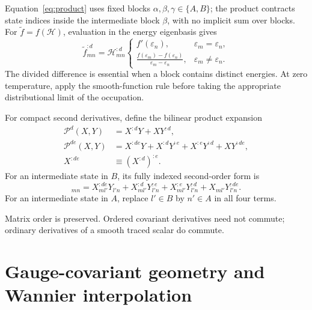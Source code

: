 \documentclass[prx,amsmath,amssymb,superscriptaddress,longbibliography]{revtex4-2}
\begin{document}
Equation~\eqref{eq:product} uses fixed blocks
$\alpha,\beta,\gamma\in\{A,B\}$; the product contracts state indices
inside the intermediate block $\beta$, with no implicit sum over blocks.
For $\widetilde f=f(\mathcal H)$, evaluation in the energy eigenbasis gives
\begin{equation}
 \widetilde f_{mn}^{:d}=\mathcal H_{mn}^{:d}
 \begin{cases}
 f'(\varepsilon_n),&\varepsilon_m=\varepsilon_n,\\[2pt]
 \displaystyle\frac{f(\varepsilon_m)-f(\varepsilon_n)}{\varepsilon_m-\varepsilon_n},
 &\varepsilon_m\ne\varepsilon_n.
 \end{cases}
 \label{eq:chain}
\end{equation}
The divided difference is essential when a block contains distinct energies.
At zero temperature, apply the smooth-function rule before taking the
appropriate distributional limit of the occupation.

For compact second derivatives, define the bilinear product expansion
\begin{align}
 \mathscr P^{d}(X,Y)&=X^{:d}Y+XY^{:d},\nonumber\\
 \mathscr P^{de}(X,Y)&=X^{:de}Y+X^{:d}Y^{:e}
                 +X^{:e}Y^{:d}+XY^{:de},
 \label{eq:second-product}\\
 X^{:de}&\equiv(X^{:d})^{:e}.
 \nonumber
\end{align}
For an intermediate state in $B$, its fully indexed second-order form is
\begin{equation}
 [\mathscr P^{de}(X_{AB},Y_{BA})]_{mn}
 =X_{ml'}^{:de}Y_{l'n}+X_{ml'}^{:d}Y_{l'n}^{:e}
  +X_{ml'}^{:e}Y_{l'n}^{:d}+X_{ml'}Y_{l'n}^{:de}.
 \label{eq:second-product-components}
\end{equation}
For an intermediate state in $A$, replace $l'\in B$ by $n'\in A$
in all four terms.

Matrix order is preserved. Ordered covariant derivatives need not commute;
ordinary derivatives of a smooth traced scalar do commute.

\section{Gauge-covariant geometry and Wannier interpolation}
\label{sec:interpolation}
\end{document}
